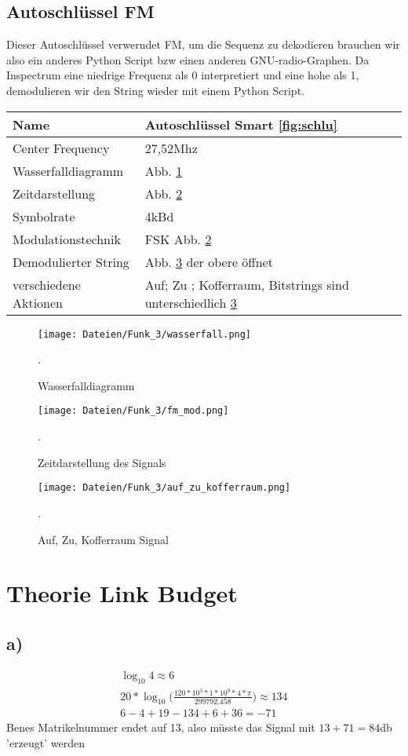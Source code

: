 \documentclass[12pt,a4paper]{article}
\begin{document}
\subsection*{Autoschlüssel FM}
Dieser Autoschlüssel verwerndet FM, um die Sequenz zu dekodieren brauchen wir also ein anderes Python Script bzw einen anderen GNU-radio-Graphen. Da Inspectrum eine niedrige Frequenz als 0 interpretiert und eine hohe als 1, demodulieren wir den String wieder mit einem Python Script.
\begin{table}[H]
\begin{tabular}{|l|l|}
\hline
Name & Autoschlüssel Smart \ref{fig:schlu} \\
\hline
Center Frequency& 27,52Mhz \\
\hline
Wasserfalldiagramm & Abb. \ref{fig:14} \\
\hline
Zeitdarstellung & Abb. \ref{fig:15} \\
\hline
Symbolrate & 4kBd  \\
\hline
Modulationstechnik & FSK Abb. \ref{fig:15}\\
\hline
Demodulierter String &   Abb. \ref{fig:16} der obere öffnet\\
\hline
verschiedene Aktionen & Auf; Zu ; Kofferraum, Bitstrings sind unterschiedlich \ref{fig:16}\\
\hline
\end{tabular}
\end{table}
\begin{figure}[H]
\centering
\texttt{[image: Dateien/Funk\_3/wasserfall.png]}
\caption{Wasserfalldiagramm} 
\label{fig:14}.
\end{figure}
\begin{figure}[H]
\centering
\texttt{[image: Dateien/Funk\_3/fm\_mod.png]}
\caption{Zeitdarstellung des Signals} 
\label{fig:15}.
\end{figure}
\begin{figure}[H]
\centering
\texttt{[image: Dateien/Funk\_3/auf\_zu\_kofferraum.png]}
\caption{Auf, Zu, Kofferraum Signal} 
\label{fig:16}.
\end{figure}
\section{Theorie Link Budget}
\subsection*{a)}
\begin{eqnarray*}
\log_{10}{4} \approx 6 \\
20*\log_{10}{(\frac{120*10^3*1*10^9*4*\pi}{299792.458}}) \approx 134 \\
6-4+19-134+6+36 = -71
\end{eqnarray*}
Benes Matrikelnummer endet auf 13, also müsste das Signal mit $13+71=84$db 'erzeugt' werden
\end{document}
